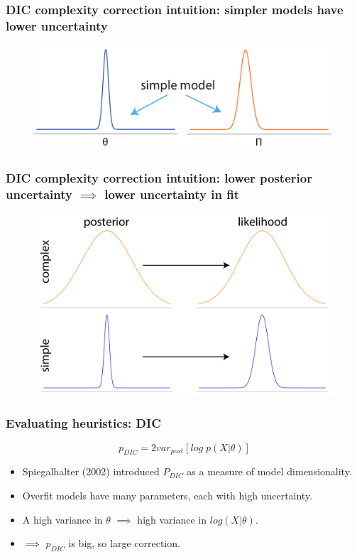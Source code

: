 \documentclass[handout]{beamer}
\begin{document}
\begin{frame}
	\frametitle{DIC complexity correction intuition: simpler models have lower uncertainty}
	
	\begin{figure}[ht]
		\centerline{\includegraphics[width=1\textwidth]{figures/lec7_simple.pdf}}
	\end{figure}
	
\end{frame}

\begin{frame}
	\frametitle{DIC complexity correction intuition: lower posterior uncertainty $\implies$ lower uncertainty in fit}
	
	\begin{figure}[ht]
		\centerline{\includegraphics[width=1\textwidth]{figures/lec7_correctionPanel.pdf}}
	\end{figure}
	
\end{frame}

\begin{frame}
	\frametitle{Evaluating heuristics: DIC}
	\begin{equation}
	p_{DIC} = 2 var_{post} \left[log\; p (X|\theta)\right]
	\end{equation}
	
	\begin{itemize}
		\item<2-> Spiegalhalter (2002) introduced $P_{DIC}$ as a measure of model dimensionality.
		\item<3-> Overfit models have many parameters, each with high uncertainty.
		\item<4-> A high variance in $\theta$ $\implies$ high variance in $log(X|\theta)$.
		\item<5-> $\implies$ $p_{DIC}$ is big, so large correction.
	\end{itemize}
	
\end{frame}
\end{document}
